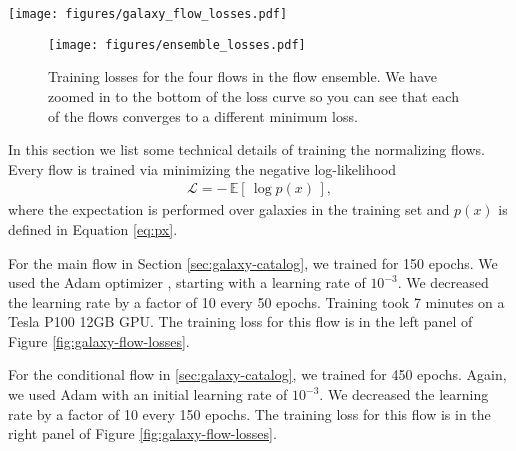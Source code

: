 \documentclass[twocolumn,twocolappendix,linenumbers]{aastex631}
\begin{document}
\begin{figure*}[t!]
    \begin{centering}
        \texttt{[image: figures/galaxy\_flow\_losses.pdf]}
        \caption{
            Training losses for the normalizing flows.
            Left: losses for the regular flow.
            After epochs 50 and 100, you can see a drop in the loss due to the decrease in the learning rate.
            Right: losses for the conditional flow.
            After epochs 150 and 300, you can see a drop in the loss due to the decrease in the learning rate.
        }
        \label{fig:galaxy-flow-losses}
    \end{centering}
\end{figure*}

\begin{figure}[t!]
    \begin{centering}
        \texttt{[image: figures/ensemble\_losses.pdf]}
        \caption{
            Training losses for the four flows in the flow ensemble.
            We have zoomed in to the bottom of the loss curve so you can see that each of the flows converges to a different minimum loss.
        }
        \label{fig:ensemble-losses}
    \end{centering}
\end{figure}

In this section we list some technical details of training the normalizing flows.
Every flow is trained via minimizing the negative log-likelihood
\begin{align}
    \mathcal{L} = - \, \mathbb{E}[ \, \log p(x) \, ],
\end{align}
where the expectation is performed over galaxies in the training set and $p(x)$ is defined in Equation \ref{eq:px}.

For the main flow in Section \ref{sec:galaxy-catalog}, we trained for 150 epochs.
We used the Adam optimizer \citep{adam}, starting with a learning rate of $10^{-3}$.
We decreased the learning rate by a factor of 10 every 50 epochs.
Training took 7 minutes on a Tesla P100 12GB GPU.
The training loss for this flow is in the left panel of Figure \ref{fig:galaxy-flow-losses}.

For the conditional flow in \ref{sec:galaxy-catalog}, we trained for 450 epochs.
Again, we used Adam with an initial learning rate of $10^{-3}$.
We decreased the learning rate by a factor of 10 every 150 epochs.
The training loss for this flow is in the right panel of Figure \ref{fig:galaxy-flow-losses}.
\end{document}

